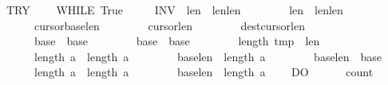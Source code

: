 \begin{isabellebody}
\ \ TRY\isanewline
\ \ \ \ WHILE\ True\ \isanewline
\ \ \ \ INV\ {\isasymlbrace}\ {\isasymacute}len{}{\isachargreater}{}\ {\isasymand}\ {\isasymacute}len{}{\isacharless}\isactrlbsup {\isasymsigma}\isactrlesup len{}\ {\isasymand}\isanewline
\ \ \ \ \ \ \ {\isasymacute}len{}{\isachargreater}{}\ {\isasymand}\ {\isasymacute}len{}{\isasymle}\isactrlbsup {\isasymsigma}\isactrlesup len{}\ {\isasymand}\isanewline
\ \ \ \ \ \ \ {\isasymacute}cursor{}{\isacharplus}{}{\isacharequal}{\isasymacute}base{}{\isacharplus}{\isasymacute}len{}\ {\isasymand}\isanewline
\ \ \ \ \ \ \ {\isasymacute}cursor{}{\isacharplus}{}{\isacharequal}{\isasymacute}len{}\ {\isasymand}\isanewline
\ \ \ \ \ \ \ {\isasymacute}dest{\isacharequal}{\isasymacute}cursor{}{\isacharplus}{\isasymacute}len{}\ {\isasymand}\isanewline
\ \ \ \ \ \ \ {\isasymacute}base{}\ {\isacharequal}\ \isactrlbsup {\isasymsigma}\isactrlesup base{}\ {\isasymand}\isanewline
\ \ \ \ \ \ \ {\isasymacute}base{}\ {\isacharequal}\ \isactrlbsup {\isasymsigma}\isactrlesup base{}\ {\isasymand}\isanewline
\ \ \ \ \ \ \ length\ {\isasymacute}tmp\ {\isacharequal}\ \isactrlbsup {\isasymsigma}\isactrlesup len{}\ {\isasymand}\isanewline
\ \ \ \ \ \ \ length\ {\isasymacute}a\ {\isacharequal}\ length\ \isactrlbsup {\isasymsigma}\isactrlesup a\ {\isasymand}\isanewline
\ \ \ \ \ \ \ {\isacharparenleft}\isactrlbsup {\isasymsigma}\isactrlesup base{}{\isacharplus}\isactrlbsup {\isasymsigma}\isactrlesup len{}\ {\isasymle}\ length\ \isactrlbsup {\isasymsigma}\isactrlesup a{\isacharparenright}\ {\isasymand}\isanewline
\ \ \ \ \ \ \ {\isacharparenleft}\isactrlbsup {\isasymsigma}\isactrlesup base{}{\isacharplus}\isactrlbsup {\isasymsigma}\isactrlesup len{}\ {\isacharequal}\ \isactrlbsup {\isasymsigma}\isactrlesup base{}{\isacharparenright}\ {\isasymand}\isanewline
\ \ \ \ \ \ \ length\ {\isasymacute}a\ {\isacharequal}\ length\ \isactrlbsup {\isasymsigma}\isactrlesup a\ {\isasymand}\isanewline
\ \ \ \ \ \ \ {\isacharparenleft}\isactrlbsup {\isasymsigma}\isactrlesup base{}{\isacharplus}\isactrlbsup {\isasymsigma}\isactrlesup len{}\ {\isasymle}\ length\ \isactrlbsup {\isasymsigma}\isactrlesup a{\isacharparenright}{\isasymrbrace}\isanewline
\ \ \ \ DO\isanewline
\ \ \ \ \ \ {\isasymacute}count{}\ {\isacharcolon}{\isacharequal}{\isacharequal}\ {}{\isacharsemicolon}{\isacharsemicolon}\isanewline

\end{isabellebody}
